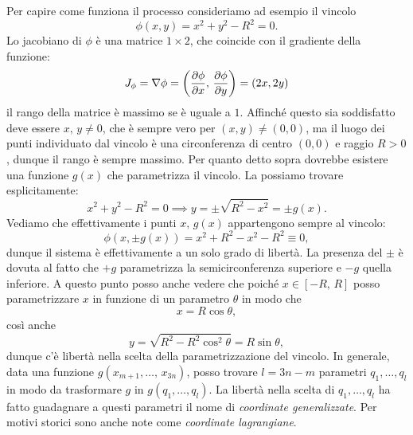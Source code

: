     Per capire come funziona il processo consideriamo ad esempio il vincolo 
    \begin{equation}
        \phi(x,y) = x^2+y^2-R^2=0.
    \end{equation}
    Lo jacobiano di $\phi$ è una matrice $1\times 2$, che coincide con il gradiente della funzione:
    \begin{equation}
        J_\phi = \nabla \phi = \left(\frac{\partial \phi}{\partial x},\,\frac{\partial \phi}{\partial y}\right) = (2x,2y)
    \end{equation}
    il rango della matrice è massimo se è uguale a $1$. Affinché questo sia soddisfatto deve essere $x,\,y \neq 0$, che è sempre vero per $(x,y) \neq(0,0)$, ma il luogo dei punti individuato dal vincolo è una circonferenza di centro $(0,0)$ e raggio $R>0$, dunque il rango è sempre massimo. Per quanto detto sopra dovrebbe esistere una funzione $g(x)$ che parametrizza il vincolo. La possiamo trovare esplicitamente:
    \begin{equation}
        x^2+y^2-R^2 = 0 \implies y = \pm \sqrt{R^2-x^2} = \pm g(x).
    \end{equation}
    Vediamo che effettivamente i punti $x,\,g(x)$ appartengono sempre al vincolo:
    \begin{equation}
        \phi(x, \pm g(x)) = x^2 + R^2-x^2 -R^2 \equiv 0,
    \end{equation}
    dunque il sistema è effettivamente a un solo grado di libertà. La presenza del $\pm$ è dovuta al fatto che $+g$ parametrizza la semicirconferenza superiore e $-g$ quella inferiore. A questo punto posso anche vedere che poiché $x\in[-R,\,R]$ posso parametrizzare $x$ in funzione di un parametro $\theta$ in modo che 
    \begin{equation}
        x= R\cos \theta,
    \end{equation}
     così anche 
     \begin{equation}
     y = \sqrt{R^2-R^2\cos^2\theta} = R\sin\theta,
     \end{equation}
     dunque c'è libertà nella scelta della parametrizzazione 
     del vincolo. In generale, data una funzione 
     $g(x_{m+1},\dots,\,x_{3n})$, posso trovare 
     $l=3n-m$ parametri $q_1,\dots, q_l$ in modo da trasformare $g$ 
     in $g(q_1,\dots,q_l)$. 
     La libertà nella scelta di $q_1,\dots, q_l$ ha
      fatto guadagnare a questi parametri il nome di 
      \emph{coordinate generalizzate}. Per motivi storici 
      sono anche note come \emph{coordinate lagrangiane}.

